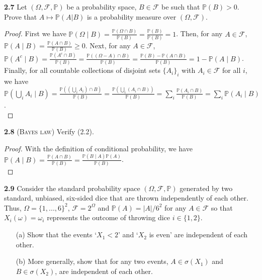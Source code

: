 \noindent\textbf{2.7}
Let $(\Omega,\mathcal{F},\mathbb{P})$ be a probability space, $B\in\mathcal{F}$ be such that $\mathbb{P}(B) > 0$. Prove that $A \mapsto \mathbb{P}(A|B)$ is a probability measure over $(\Omega,\mathcal{F})$.
\begin{proof}
    First we have $\mathbb{P}(\Omega \mid B) = \frac{\mathbb{P}(\Omega \cap B)}{\mathbb{P}(B)} = \frac{\mathbb{P}(B)}{\mathbb{P}(B)} = 1$. 
    Then, for any $A \in \mathcal{F}$, $\mathbb{P}(A \mid B) = \frac{\mathbb{P}(A \cap B)}{\mathbb{P}(B)} \geq 0$. 
    Next, for any $A \in \mathcal{F}$, $\mathbb{P}(A^c \mid B) = \frac{\mathbb{P}(A^c \cap B)}{\mathbb{P}(B)} = \frac{\mathbb{P}((\Omega - A) \cap B)}{\mathbb{P}(B)} = \frac{\mathbb{P}(B) - \mathbb{P}(A \cap B)}{\mathbb{P}(B)} = 1 - \mathbb{P}(A \mid B)$. 
    Finally, for all countable collections of disjoint sets $\{A_i\}_i$ with $A_i \in \mathcal{F}$ for all $i$, we have $\mathbb{P}\left(\bigcup_{i} A_{i} \mid B\right) = \frac{\mathbb{P}((\bigcup_{i} A_{i}) \cap B)}{\mathbb{P}(B)} = \frac{\mathbb{P}(\bigcup_{i} (A_{i} \cap B))}{\mathbb{P}(B)} = \sum_{i} \frac{\mathbb{P}(A_{i} \cap B)}{\mathbb{P}(B)} = \sum_{i} \mathbb{P}(A_i \mid B)$. \\
\end{proof}

\noindent\textbf{2.8}
\textsc{(Bayes law)} Verify (2.2).

\begin{proof}
    With the definition of conditional probability, we have $\mathbb{P}(A \mid B) = \frac{\mathbb{P}(A \cap B)}{\mathbb{P}(B)} = \frac{\mathbb{P}(B \mid A) \mathbb{P}(A)}{\mathbb{P}(B)}$. \\
\end{proof}

\noindent\textbf{2.9}
Consider the standard probability space $(\Omega,\mathcal{F},\mathbb{P})$ generated by two standard, unbiased, six-sided dice that are thrown independently of each other. Thus,
$\Omega=\{1, . . . , 6\}^2$, $\mathcal{F} = 2^{\Omega}$ and $\mathbb{P}(A) = |A|/6^2$ for any $A\in\mathcal{F}$ so that $X_i(\omega)=\omega_i$ represents the outcome of throwing dice $i\in\{1,2\}$.
\begin{enumerate}
    \item[(a)] Show that the events `$X_1 < 2$' and `$X_2$ is even' are independent of each other.
    \item[(b)] More generally, show that for any two events, $A\in \sigma(X_1)$ and $B\in \sigma(X_2)$, are independent of each other.
\end{enumerate}

